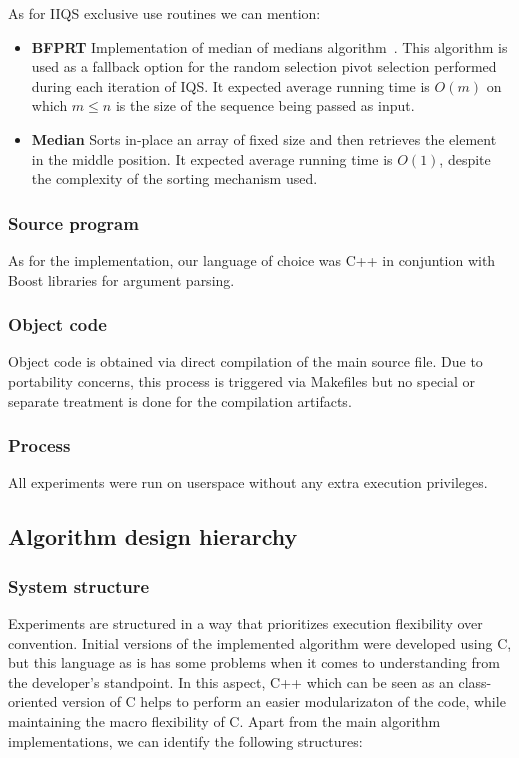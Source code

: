 As for IIQS exclusive use routines we can mention:
\begin{itemize}
    \item \textbf{BFPRT} Implementation of median of medians algorithm~\cite{Blum_Floyd_Pratt_Rivest_Tarjan_1973}. This algorithm is used as a fallback option for the random selection pivot selection performed during each iteration of IQS. It expected average running time is $O(m)$ on which $m \leq n$ is the size of the sequence being passed as input.
    \item \textbf{Median} Sorts in-place an array of fixed size and then retrieves the element in the middle position. It expected average running time is $O(1)$, despite the complexity of the sorting mechanism used.
\end{itemize}

\subsubsection{Source program}
As for the implementation, our language of choice was C++ in conjuntion with Boost libraries for argument parsing. 

\subsubsection{Object code}
Object code is obtained via direct compilation of the main source file. Due to portability concerns, this process is triggered via Makefiles but no special or separate treatment is done for the compilation artifacts.

\subsubsection{Process}
All experiments were run on userspace without any extra execution privileges.

\subsection{Algorithm design hierarchy}

\subsubsection{System structure}
Experiments are structured in a way that prioritizes execution flexibility over convention. Initial versions of the implemented algorithm were developed using C, but this language as is has some problems when it comes to understanding from the developer's standpoint. In this aspect, C++ which can be seen as an class-oriented version of C helps to perform an easier modularizaton of the code, while maintaining the macro flexibility of C. Apart from the main algorithm implementations, we can identify the following structures:

